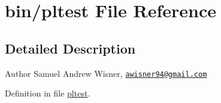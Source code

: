 \hypertarget{pltest}{\section{bin/pltest File Reference}
\label{pltest}
}


\subsection{Detailed Description}
\begin{DoxyAuthor}{Author}
Samuel Andrew Wisner, \href{mailto:awisner94@gmail.com}{\tt awisner94@gmail.\+com} 
\end{DoxyAuthor}


Definition in file \hyperlink{pltest_source}{pltest}.

